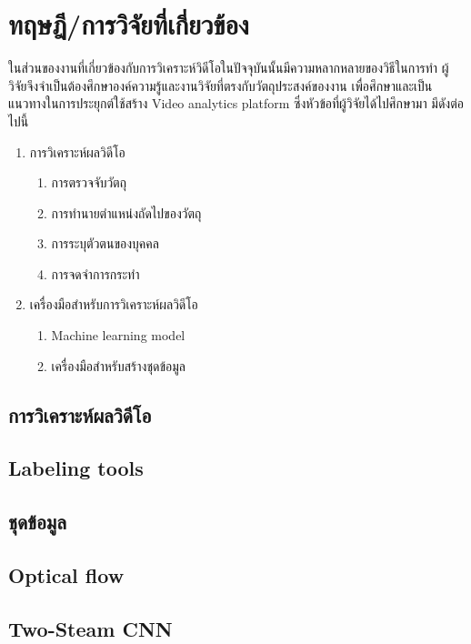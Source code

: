 \clearpage
\chapter{ทฤษฎี/การวิจัยที่เกี่ยวข้อง}
ในส่วนของงานที่เกี่ยวข้องกับการวิเคราะห์วิดีโอในปัจจุบันนั้นมีความหลากหลายของวิธีในการทำ ผู้วิจัยจึงจำเป็นต้องศึกษาองค์ความรู้และงานวิจัยที่ตรงกับวัตถุประสงค์ของงาน เพื่อศึกษาและเป็นแนวทางในการประยุกต์ใช้สร้าง Video analytics platform ซึ่งหัวข้อที่ผู้วิจัยได้ไปศึกษามา มีดังต่อไปนี้
\begin{enumerate}
	\setlength\itemsep{-0.25em}
	\item การวิเคราะห์ผลวิดีโอ
	\begin{enumerate}	
		\item การตรวจจับวัตถุ
		\item การทำนายตำแหน่งถัดไปของวัตถุ
		\item การระบุตัวตนของบุคคล
		\item การจดจำการกระทำ
	\end{enumerate}
	\setlength\itemsep{-0.25em}
	\item เครื่องมือสำหรับการวิเคราะห์ผลวิดีโอ
	\begin{enumerate}	
		\item Machine learning model
		\item เครื่องมือสำหรับสร้างชุดข้อมูล
	\end{enumerate}
\end{enumerate}

\section{การวิเคราะห์ผลวิดีโอ}


\clearpage
\section{Labeling tools}


\clearpage
\section{ชุดข้อมูล}

\clearpage

\clearpage


\section{Optical flow}


\clearpage
\section{Two-Steam CNN}





